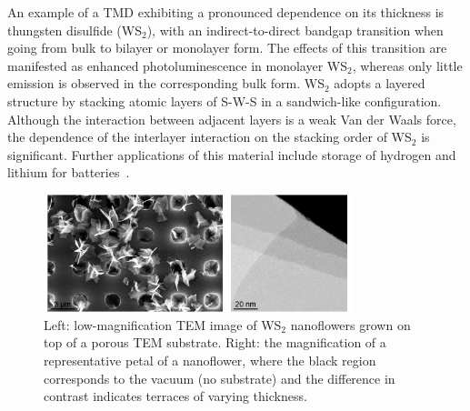 An example of a TMD exhibiting a pronounced dependence on its thickness is 
thungsten disulfide (WS$_2$), with an indirect-to-direct bandgap transition when going
from bulk to bilayer or monolayer form.
%
The effects of this transition are manifested as enhanced
photoluminescence in monolayer WS$_2$, whereas only little emission is observed in
the corresponding bulk form.
%
WS$_2$ adopts a layered structure by stacking atomic layers of S-W-S 
in a sandwich-like configuration. 
%
Although the interaction between adjacent layers is a weak Van der Waals 
force, the dependence of the interlayer interaction on the stacking 
order of WS$_2$ is significant.
%
Further applications of this material include storage of hydrogen 
and lithium for batteries~\cite{Bhandavat:2012}.

\begin{figure}[h]
    \centering
    \includegraphics[width=0.8\textwidth]{plots/spectrumimage.pdf}
    \caption{Left: low-magnification TEM image of WS$_2$ nanoflowers
      grown on top of a porous TEM substrate. Right: the magnification of a representative 
      petal of a nanoflower, where the black region corresponds to 
      the vacuum (no substrate) and the difference in contrast indicates terraces of varying thickness.}
    \label{fig:nanoflowers}
\end{figure}

